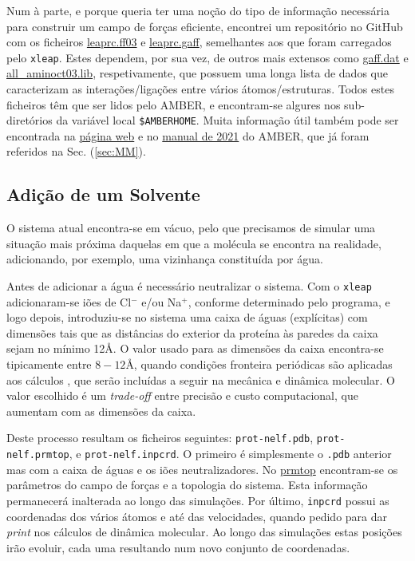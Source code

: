 \documentclass[12pt,a4paper]{article}
\begin{document}
	Num à parte, e porque queria ter uma noção do tipo de informação necessária para construir um campo de forças eficiente, encontrei um repositório no GitHub com os ficheiros \href{https://github.com/choderalab/ambermini/blob/master/share/amber/dat/leap/cmd/oldff/leaprc.ff03}{leaprc.ff03} e \href{https://github.com/choderalab/ambermini/blob/master/share/amber/dat/leap/cmd/leaprc.gaff}{leaprc.gaff}, semelhantes aos que foram carregados pelo \verb|xleap|. Estes dependem, por sua vez, de outros mais extensos como \href{https://github.com/choderalab/ambermini/blob/master/share/amber/dat/leap/parm/gaff.dat}{gaff.dat} e \href{https://github.com/choderalab/ambermini/blob/master/share/amber/dat/leap/lib/all_aminoct03.lib}{all\_aminoct03.lib}, respetivamente, que possuem uma longa lista de dados que caracterizam as interações/ligações entre vários átomos/estruturas. Todos estes ficheiros têm que ser lidos pelo AMBER, e encontram-se algures nos sub-diretórios da variável local \verb|$AMBERHOME|. Muita informação útil também pode ser encontrada na \href{https://ambermd.org/AmberModels.php}{página web} e no \href{https://ambermd.org/doc12/Amber21.pdf#page=264}{manual de 2021} do AMBER, que já foram referidos na Sec. (\ref{sec:MM}).
	
\subsection{Adição de um Solvente}
	O sistema atual encontra-se em vácuo, pelo que precisamos de simular uma situação mais próxima daquelas em que a molécula se encontra na realidade, adicionando, por exemplo, uma vizinhança constituída por água.
	
	Antes de adicionar a água é necessário neutralizar o sistema. Com o \verb|xleap| adicionaram-se iões de Cl$^-$ e/ou Na$^+$, conforme determinado pelo programa, e logo depois, introduziu-se no sistema uma caixa de águas (explícitas) com dimensões tais que as distâncias do exterior da proteína às paredes da caixa sejam no mínimo 12\AA. O valor usado para as dimensões da caixa encontra-se tipicamente entre $8-12$\AA, quando condições fronteira periódicas são aplicadas aos cálculos \cite{galindo-murilloMolecularModelingNucleic2014}, que serão incluídas a seguir na mecânica e dinâmica molecular. O valor escolhido é um \textit{trade-off} entre precisão e custo computacional, que aumentam com as dimensões da caixa.
	
	Deste processo resultam os ficheiros seguintes: \verb|prot-nelf.pdb|, \verb|prot-nelf.prmtop|, e \verb|prot-nelf.inpcrd|. O primeiro é simplesmente o \verb|.pdb| anterior mas com a caixa de águas e os iões neutralizadores. No \href{https://ambermd.org/FileFormats.php#topology}{prmtop} encontram-se os parâmetros do campo de forças e a topologia do sistema. Esta informação permanecerá inalterada ao longo das simulações. Por último, \verb|inpcrd| possui as coordenadas dos vários átomos e até das velocidades, quando pedido para dar \textit{print} nos cálculos de dinâmica molecular. Ao longo das simulações estas posições irão evoluir, cada uma resultando num novo conjunto de coordenadas.	
		
\end{document}
